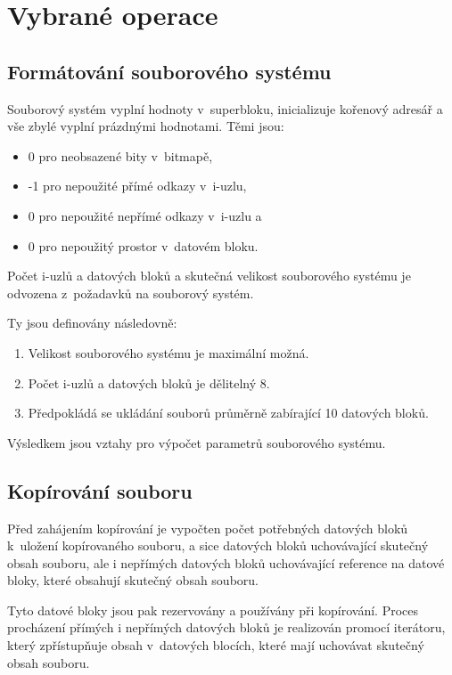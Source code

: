 \documentclass[a4paper, 12pt]{report}
\begin{document}
\section{Vybrané operace}

\subsection{Formátování souborového systému}

Souborový systém vyplní hodnoty v~superbloku, inicializuje kořenový adresář a vše zbylé vyplní prázdnými hodnotami. Těmi jsou:

\begin{itemize}
    \item 0 pro neobsazené bity v~bitmapě,
    \item -1 pro nepoužité přímé odkazy v~i-uzlu,
    \item 0 pro nepoužité nepřímé odkazy v~i-uzlu a
    \item 0 pro nepoužitý prostor v~datovém bloku.
\end{itemize}

Počet i-uzlů a datových bloků a skutečná velikost souborového systému je odvozena z~požadavků na souborový systém.

Ty jsou definovány následovně:

\begin{enumerate}
    \item Velikost souborového systému je maximální možná.
    \item Počet i-uzlů a datových bloků je dělitelný 8.
    \item Předpokládá se ukládání souborů průměrně zabírající 10 datových bloků.
\end{enumerate}

Výsledkem jsou vztahy pro výpočet parametrů souborového systému.

\subsection{Kopírování souboru}

Před zahájením kopírování je vypočten počet potřebných datových bloků k~uložení kopírovaného souboru, a sice datových bloků uchovávající skutečný obsah souboru, ale i nepřímých datových bloků uchovávající reference na datové bloky, které obsahují skutečný obsah souboru.

Tyto datové bloky jsou pak rezervovány a používány při kopírování. Proces procházení přímých i nepřímých datových bloků je realizován promocí iterátoru, který zpřístupňuje obsah v~datových blocích, které mají uchovávat skutečný obsah souboru.
\end{document}
